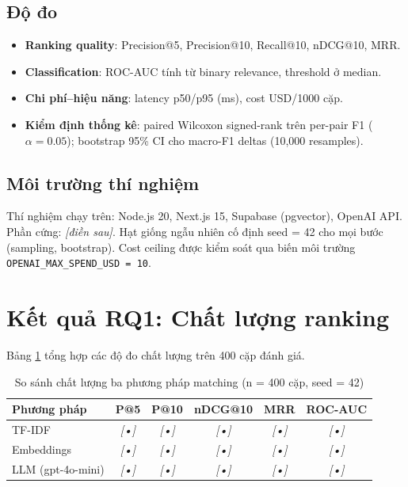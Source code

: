 \documentclass[../DoAn.tex]{subfiles}
\begin{document}
\subsection{Độ đo}

\begin{itemize}
    \item \textbf{Ranking quality}: Precision@5, Precision@10, Recall@10, nDCG@10, MRR.
    \item \textbf{Classification}: ROC-AUC tính từ binary relevance, threshold ở median.
    \item \textbf{Chi phí--hiệu năng}: latency p50/p95 (ms), cost USD/1000 cặp.
    \item \textbf{Kiểm định thống kê}: paired Wilcoxon signed-rank trên per-pair F1 ($\alpha = 0.05$); bootstrap 95\% CI cho macro-F1 deltas (10,000 resamples).
\end{itemize}

\subsection{Môi trường thí nghiệm}

Thí nghiệm chạy trên: Node.js 20, Next.js 15, Supabase (pgvector), OpenAI API. Phần cứng: \textit{[điền sau]}. Hạt giống ngẫu nhiên cố định seed = 42 cho mọi bước (sampling, bootstrap). Cost ceiling được kiểm soát qua biến môi trường \texttt{OPENAI\_MAX\_SPEND\_USD = 10}.

\section{Kết quả RQ1: Chất lượng ranking}
\label{sec:rq1}

Bảng \ref{tab:rq1_main} tổng hợp các độ đo chất lượng trên 400 cặp đánh giá.

\begin{table}[H]
\centering
\caption{So sánh chất lượng ba phương pháp matching (n = 400 cặp, seed = 42)}
\label{tab:rq1_main}
\begin{tabular}{|l|c|c|c|c|c|}
\hline
\textbf{Phương pháp} & \textbf{P@5} & \textbf{P@10} & \textbf{nDCG@10} & \textbf{MRR} & \textbf{ROC-AUC} \\ \hline
TF-IDF       & \textit{[•]} & \textit{[•]} & \textit{[•]} & \textit{[•]} & \textit{[•]} \\ \hline
Embeddings   & \textit{[•]} & \textit{[•]} & \textit{[•]} & \textit{[•]} & \textit{[•]} \\ \hline
LLM (gpt-4o-mini) & \textit{[•]} & \textit{[•]} & \textit{[•]} & \textit{[•]} & \textit{[•]} \\ \hline
\end{tabular}
\end{table}
\end{document}
